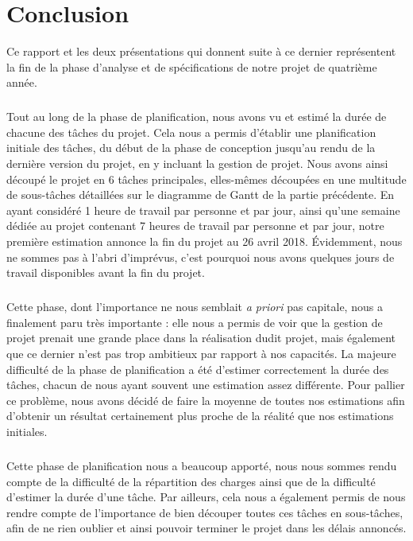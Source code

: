 \chapter{Conclusion}

Ce rapport et les deux présentations qui donnent suite à ce dernier représentent la fin
de la phase d’analyse et de spécifications de notre projet de quatrième année.

\paragraph{}

Tout au long de la phase de planification, nous avons vu et estimé la durée de chacune des tâches du projet. Cela nous a permis d’établir une planification initiale des tâches, du début de la phase de conception jusqu’au rendu de la dernière version du projet, en y incluant la gestion de projet. Nous avons ainsi découpé le projet en 6 tâches principales, elles-mêmes découpées en une multitude de sous-tâches détaillées sur le diagramme de Gantt de la partie précédente. En ayant considéré 1 heure de travail par personne et par jour, ainsi qu’une semaine dédiée au projet contenant 7 heures de travail par personne et par jour,  notre première estimation annonce la fin du projet au 26 avril 2018. Évidemment, nous ne sommes pas à l’abri d’imprévus, c’est pourquoi nous avons quelques jours de travail disponibles avant la fin du projet.

\paragraph{}

Cette phase, dont l’importance ne nous semblait \textit{a priori} pas capitale, nous a finalement paru très importante : elle nous a permis de voir que la gestion de projet prenait une grande place dans la réalisation dudit projet, mais également que ce dernier n’est pas trop ambitieux par rapport à nos capacités. La majeure difficulté de la phase de planification a été d’estimer correctement la durée des tâches, chacun de nous ayant souvent une estimation assez différente. Pour pallier ce problème, nous avons décidé de faire la moyenne de toutes nos estimations afin d’obtenir un résultat certainement plus proche de la réalité que nos estimations initiales.

\paragraph{}

Cette phase de planification nous a beaucoup apporté, nous nous sommes rendu compte de la difficulté de la répartition des charges ainsi que de la difficulté d’estimer la durée d’une tâche. Par ailleurs, cela nous a également permis de nous rendre compte de l’importance de bien découper toutes ces tâches en sous-tâches, afin de ne rien oublier et ainsi pouvoir terminer le projet dans les délais annoncés.
